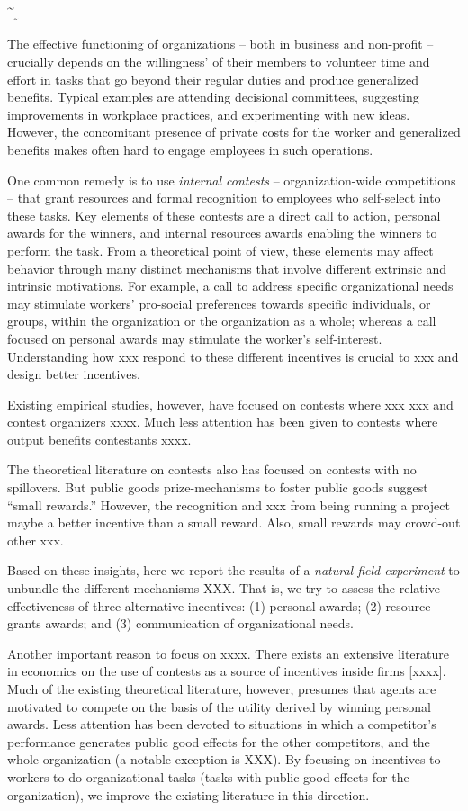 \documentclass[12pt, titlepage]{article}
\begin{document}
\textasciitilde{}\textsubscript{\textsubscript{\textsubscript{\textasciitilde{}}}}

The effective functioning of organizations -- both in business and
non-profit -- crucially depends on the willingness' of their members to
volunteer time and effort in tasks that go beyond their regular duties
and produce generalized benefits. Typical examples are attending
decisional committees, suggesting improvements in workplace practices,
and experimenting with new ideas. However, the concomitant presence of
private costs for the worker and generalized benefits makes often hard
to engage employees in such operations.

One common remedy is to use \emph{internal contests} --
organization-wide competitions -- that grant resources and formal
recognition to employees who self-select into these tasks. Key elements
of these contests are a direct call to action, personal awards for the
winners, and internal resources awards enabling the winners to perform
the task. From a theoretical point of view, these elements may affect
behavior through many distinct mechanisms that involve different
extrinsic and intrinsic motivations. For example, a call to address
specific organizational needs may stimulate workers' pro-social
preferences towards specific individuals, or groups, within the
organization or the organization as a whole; whereas a call focused on
personal awards may stimulate the worker's self-interest. Understanding
how xxx respond to these different incentives is crucial to xxx and
design better incentives.

Existing empirical studies, however, have focused on contests where xxx
xxx and contest organizers xxxx. Much less attention has been given to
contests where output benefits contestants xxxx.

The theoretical literature on contests also has focused on contests with
no spillovers. But public goods prize-mechanisms to foster public goods
suggest ``small rewards.'' However, the recognition and xxx from being
running a project maybe a better incentive than a small reward. Also,
small rewards may crowd-out other xxx.

Based on these insights, here we report the results of a \emph{natural
field experiment} to unbundle the different mechanisms XXX. That is, we
try to assess the relative effectiveness of three alternative
incentives: (1) personal awards; (2) resource-grants awards; and (3)
communication of organizational needs.

Another important reason to focus on xxxx. There exists an extensive
literature in economics on the use of contests as a source of incentives
inside firms {[}xxxx{]}. Much of the existing theoretical literature,
however, presumes that agents are motivated to compete on the basis of
the utility derived by winning personal awards. Less attention has been
devoted to situations in which a competitor's performance generates
public good effects for the other competitors, and the whole
organization (a notable exception is XXX). By focusing on incentives to
workers to do organizational tasks (tasks with public good effects for
the organization), we improve the existing literature in this direction.
\end{document}
